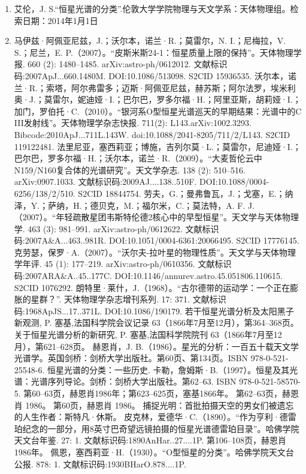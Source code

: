 \begin{enumerate}
\item 艾伦，J. S.“恒星光谱的分类”.伦敦大学学院物理与天文学系：天体物理组。检索日期：2014年1月1日
\item 马伊兹·阿佩亚尼兹，J.；沃尔本，诺兰·R.；莫雷尔，N. I.；尼梅拉，V. S.；尼兰，E. P.（2007）。“皮斯米斯24-1：恒星质量上限的保持”。天体物理学报. 660 (2): 1480–1485. arXiv:astro-ph/0612012. 文献标识码:2007ApJ...660.1480M. DOI:10.1086/513098. S2CID 15936535.
 沃尔本，诺兰·R.；索塔，阿尔弗雷多；迈斯·阿佩亚尼兹，赫苏斯；阿尔法罗，埃米利奥·J.；莫雷尔，妮迪娅·I.；巴尔巴，罗多尔福·H.；阿里亚斯，胡莉娅·I.；加门，罗伯托·C.（2010）。“银河系O型恒星光谱巡天的早期结果：光谱中的C III发射线”。天体物理学杂志快报. 711(2): L143.arXiv:1002.3293. Bibcode:2010ApJ...711L.143W. doi:10.1088/2041-8205/711/2/L143. S2CID 119122481.
 法里尼亚，塞西莉亚；博施，吉列尔莫·L.；莫雷尔，尼迪娅·I.；巴尔巴，罗多尔福·H.；沃尔本，诺兰·R.（2009）。“大麦哲伦云中N159/N160复合体的光谱研究”。天文学杂志. 138 (2): 510–516. arXiv:0907.1033. 文献标识码:2009AJ....138..510F. DOI:10.1088/0004-6256/138/2/510. S2CID 18844754.
 劳夫，G.；曼弗鲁瓦，J.；戈塞，E.；纳泽，Y.；萨纳，H.；德贝克，M.；福尔米，C.；莫法特，A. F. J.（2007）。“年轻疏散星团韦斯特伦德2核心中的早型恒星”。天文学与天体物理学. 463 (3): 981–991. arXiv:astro-ph/0612622. 文献标识码:2007A&A...463..981R. DOI:10.1051/0004-6361:20066495. S2CID 17776145.
 克劳瑟，保罗·A.（2007）。“沃尔夫-拉叶星的物理性质”。天文学与天体物理学年评. 45 (1): 177–219. arXiv:astro-ph/0610356. 文献标识码:2007ARA&A..45..177C. DOI:10.1146/annurev.astro.45.051806.110615. S2CID 1076292.
 朗特里·莱什，J.（1968）。“古尔德带的运动学：一个正在膨胀的星群？”. 天体物理学杂志增刊系列. 17: 371. 文献标识码:1968ApJS...17..371L. DOI:10.1086/190179.
 若干恒星光谱分析及太阳黑子新观测, P. 塞基,法国科学院会议记录 63（1866年7月至12月），第364–368页。
 关于恒星光谱分析的新研究, P. 塞基,法国科学院院刊 63（1866年7月至12月），第621–628页。
 赫恩肖，J. B.（1986）。星光的分析：一百五十载天文学光谱学。英国剑桥：剑桥大学出版社。第60页、第134页。ISBN 978-0-521-25548-6.
 恒星光谱的分类：一些历史.
 卡勒，詹姆斯·B.（1997）。恒星及其光谱：光谱序列导论。剑桥：剑桥大学出版社。第62–63. ISBN 978-0-521-58570-5.
 第60–63页，赫恩肖1986年；第623–625页，塞基1866年。
 第62–63页，赫恩肖 1986。
 第60页，赫恩肖 1986。
 捕捉光明：首批拍摄天空的男女们被遗忘的人生作者：斯特凡·休斯。
 皮克林，爱德华·C.（1890）。“作为亨利·德雷珀纪念的一部分，用8英寸巴奇望远镜拍摄的恒星光谱德雷珀目录”。哈佛学院天文台年鉴. 27: 1. 文献标识码:1890AnHar..27....1P.
 第106–108页，赫恩肖 1986年。
 佩恩，塞西莉亚·H.（1930）。“O型恒星的分类”。哈佛学院天文台公报. 878: 1. 文献标识码:1930BHarO.878....1P.

\end{enumerate}
